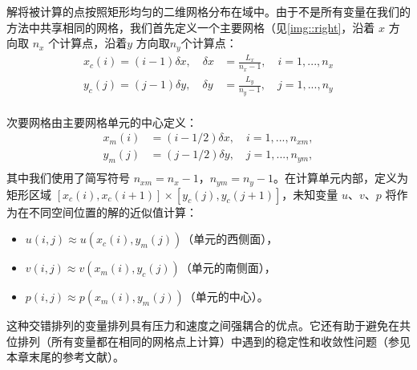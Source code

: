 \documentclass[12pt, a4paper]{article}
\numberwithin{equation}{section} %
\begin{document}
解将被计算的点按照矩形均匀的二维网格分布在域中。由于不是所有变量在我们的方法中共享相同的网格，我们首先定义一个主要网格（见\ref{img::right}，沿着 $x$ 方向取 $n_x$ 个计算点，沿着$y$ 方向取$ n_y $个计算点：
\begin{equation}
\begin{aligned}
x_c(i) = (i - 1)\delta x, \quad \delta x &= \frac{L_x}{n_x - 1},\quad i = 1,..., n_x \\
y_c(j) = (j - 1)\delta y,\quad \delta y &= \frac{L_y}{n_y - 1},\quad j = 1,..., n_y  \\
\end{aligned}
\end{equation}



次要网格由主要网格单元的中心定义：
\begin{equation}
\begin{aligned}
x_m(i) &= (i - 1/2)\delta x,\quad i = 1,...,n_{xm},\\
y_m(j) &= (j - 1/2)\delta y,\quad j = 1,...,n_{ym},\\
\end{aligned}
\end{equation}
其中我们使用了简写符号 $n_{xm} = n_x - 1$，$n_{ym} = n_y - 1$。在计算单元内部，定义为矩形区域 $\left[x_c(i),x_c(i + 1)\right] \times \left[y_c(j), y_c(j + 1)\right]$，未知变量 $u$、$v$、$p$ 将作为在不同空间位置的解的近似值计算：
\begin{itemize}
    \item $u(i, j) \approx u(x_c(i), y_m(j))$（单元的西侧面），
    \item $v(i, j) \approx v(x_m(i), y_c(j))$（单元的南侧面），
    \item $p(i, j) \approx p(x_m(i), y_m(j))$（单元的中心）。
\end{itemize}

这种交错排列的变量排列具有压力和速度之间强耦合的优点。它还有助于避免在共位排列（所有变量都在相同的网格点上计算）中遇到的稳定性和收敛性问题（参见本章末尾的参考文献）。
\newpage


\end{document}

